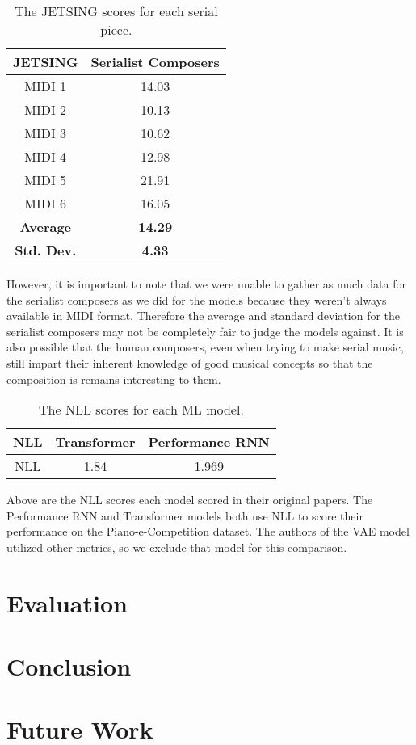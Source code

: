 \documentclass[11pt]{article}
\begin{document}
\begin{table}[h!]
    \centering
    \caption{The JETSING scores for each serial piece.}
    \begin{tabular}{c c}
        \hline
        JETSING & Serialist Composers \\
        \hline
        MIDI 1 & 14.03 \\
        \hline
        MIDI 2 & 10.13 \\
        \hline
        MIDI 3 & 10.62 \\
        \hline
        MIDI 4 & 12.98 \\
        \hline
        MIDI 5 & 21.91 \\
        \hline
        MIDI 6 & 16.05 \\
        \hline
        \hline
        \textbf{Average} & \textbf{14.29} \\
        \hline
        \textbf{Std. Dev.} & \textbf{4.33} \\
        \hline
    \end{tabular}
\end{table}

However, it is important to note that we were unable to gather as much data for the serialist composers as we did for the models because they weren't always available in MIDI format.
Therefore the average and standard deviation for the serialist composers may not be completely fair to judge the models against.
It is also possible that the human composers, even when trying to make serial music, still impart their inherent knowledge of good musical concepts so that the composition is remains interesting to them.

\begin{table}
    \centering
    \caption{The NLL scores for each ML model.}
    \begin{tabular}{c c c}
        \hline
        NLL & Transformer & Performance RNN \\
        \hline
        NLL & 1.84 & 1.969 \\
        \hline
    \end{tabular}
\end{table}

Above are the NLL scores each model scored in their original papers.
The Performance RNN and Transformer models both use NLL to score their performance on the Piano-e-Competition dataset.
The authors of the VAE model utilized other metrics, so we exclude that model for this comparison.

\section{Evaluation}

\section{Conclusion}

\section{Future Work}




\nocite{huang2018music, kotecha2018generating, vaswani2017attention, zhao2020verticalhorizontal, performance-rnn-2017, musicVAE}
\end{document}
